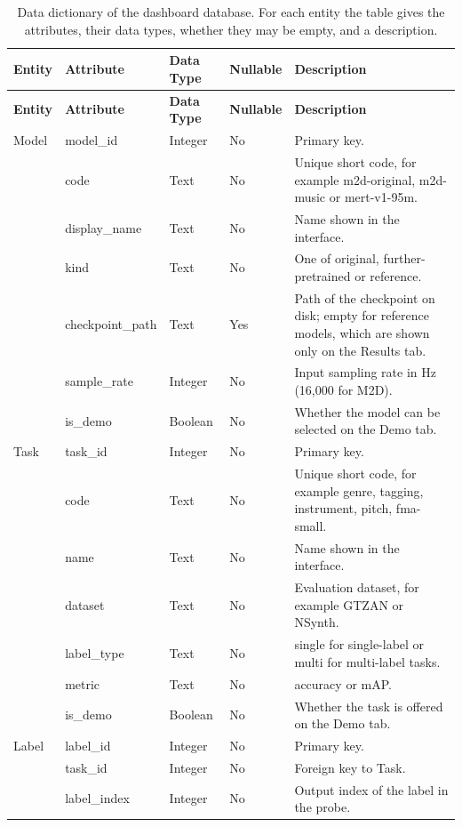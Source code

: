 \documentclass{FastFyp}
\begin{document}
{\small\singlespacing
\begin{longtable}{P{2.8cm}P{2.6cm}P{1.6cm}P{1.4cm}P{5.35cm}}
\caption[Data dictionary of the dashboard database]{Data dictionary of the dashboard database. For each entity the table gives the attributes, their data types, whether they may be empty, and a description.}\label{tab:srs-dd}\\
\toprule
\textbf{Entity} & \textbf{Attribute} & \textbf{Data Type} & \textbf{Nullable} & \textbf{Description}\\
\midrule
\endfirsthead
\toprule
\textbf{Entity} & \textbf{Attribute} & \textbf{Data Type} & \textbf{Nullable} & \textbf{Description}\\
\midrule
\endhead
\bottomrule
\endfoot
Model & model\_id & Integer & No & Primary key.\\
 & code & Text & No & Unique short code, for example m2d-original, m2d-music or mert-v1-95m.\\
 & display\_name & Text & No & Name shown in the interface.\\
 & kind & Text & No & One of original, further-pretrained or reference.\\
 & checkpoint\_path & Text & Yes & Path of the checkpoint on disk; empty for reference models, which are shown only on the Results tab.\\
 & sample\_rate & Integer & No & Input sampling rate in Hz (16,000 for M2D).\\
 & is\_demo & Boolean & No & Whether the model can be selected on the Demo tab.\\
\midrule
Task & task\_id & Integer & No & Primary key.\\
 & code & Text & No & Unique short code, for example genre, tagging, instrument, pitch, fma-small.\\
 & name & Text & No & Name shown in the interface.\\
 & dataset & Text & No & Evaluation dataset, for example GTZAN or NSynth.\\
 & label\_type & Text & No & single for single-label or multi for multi-label tasks.\\
 & metric & Text & No & accuracy or mAP.\\
 & is\_demo & Boolean & No & Whether the task is offered on the Demo tab.\\
\midrule
Label & label\_id & Integer & No & Primary key.\\
 & task\_id & Integer & No & Foreign key to Task.\\
 & label\_index & Integer & No & Output index of the label in the probe.\\

\end{longtable}}
\end{document}
